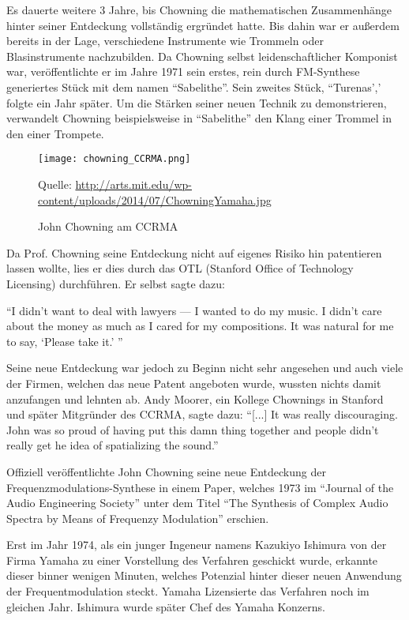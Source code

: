 Es dauerte weitere 3 Jahre, bis Chowning die mathematischen Zusammenhänge hinter seiner Entdeckung vollständig ergründet hatte. Bis dahin war er außerdem bereits in der Lage, verschiedene Instrumente wie Trommeln oder Blasinstrumente nachzubilden. Da Chowning selbst leidenschaftlicher Komponist war, veröffentlichte er im Jahre 1971 sein erstes, rein durch FM-Synthese generiertes Stück mit dem namen ``Sabelithe''. Sein zweites Stück, ``Turenas',' folgte ein Jahr später.
Um die Stärken seiner neuen Technik zu demonstrieren, verwandelt Chowning beispielsweise in ``Sabelithe'' den Klang einer Trommel in den einer Trompete.
 
\begin{figure} [ht]
\centering
  \texttt{[image: chowning\_CCRMA.png]}
\caption{John Chowning am CCRMA}
Quelle: \url{http://arts.mit.edu/wp-content/uploads/2014/07/ChowningYamaha.jpg}
\end{figure}
 
Da Prof. Chowning seine Entdeckung nicht auf eigenes Risiko hin patentieren lassen wollte, lies er dies durch das OTL (Stanford Office of Technology Licensing) durchführen. Er selbst sagte dazu:

``I didn’t want to deal with lawyers — I wanted to do my music. I didn’t care about the money as much as I cared for my compositions. It was natural for me to say, `Please take it.' ''

 Seine neue Entdeckung war jedoch zu Beginn nicht sehr angesehen und auch viele der Firmen, welchen das neue Patent angeboten wurde, wussten nichts damit anzufangen und lehnten ab. Andy Moorer, ein Kollege Chownings in Stanford und später Mitgründer des CCRMA, sagte dazu: ``[...] It was really discouraging. John was so proud of having put this damn thing together and people didn't really get he idea of spatializing the sound.''

Offiziell veröffentlichte John Chowning seine neue Entdeckung der Frequenzmodulations-Synthese in einem Paper, welches 1973 im ``Journal of the Audio Engineering Society'' unter dem Titel ``The Synthesis of Complex Audio Spectra by Means of Frequenzy Modulation'' erschien.

Erst im Jahr 1974, als ein junger Ingeneur namens Kazukiyo Ishimura von der Firma Yamaha zu einer Vorstellung des Verfahren geschickt wurde, erkannte dieser binner wenigen Minuten, welches Potenzial hinter dieser neuen Anwendung der Frequentmodulation steckt. Yamaha Lizensierte das Verfahren noch im gleichen Jahr. Ishimura wurde später Chef des Yamaha Konzerns. 

